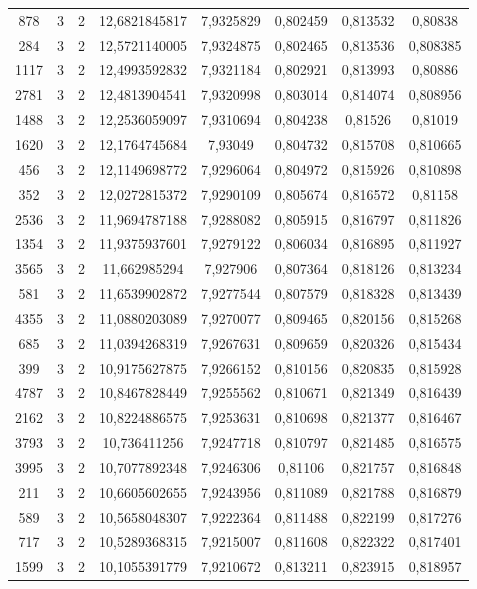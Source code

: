 \begin{longtable}{|c|c|c|c|c|c|c|c|}
878 & 3 & 2 & 12,6821845817 & 7,9325829 & 0,802459 & 0,813532 & 0,80838 \\
284 & 3 & 2 & 12,5721140005 & 7,9324875 & 0,802465 & 0,813536 & 0,808385 \\
1117 & 3 & 2 & 12,4993592832 & 7,9321184 & 0,802921 & 0,813993 & 0,80886 \\
2781 & 3 & 2 & 12,4813904541 & 7,9320998 & 0,803014 & 0,814074 & 0,808956 \\
1488 & 3 & 2 & 12,2536059097 & 7,9310694 & 0,804238 & 0,81526 & 0,81019 \\
1620 & 3 & 2 & 12,1764745684 & 7,93049 & 0,804732 & 0,815708 & 0,810665 \\
456 & 3 & 2 & 12,1149698772 & 7,9296064 & 0,804972 & 0,815926 & 0,810898 \\
352 & 3 & 2 & 12,0272815372 & 7,9290109 & 0,805674 & 0,816572 & 0,81158 \\
2536 & 3 & 2 & 11,9694787188 & 7,9288082 & 0,805915 & 0,816797 & 0,811826 \\
1354 & 3 & 2 & 11,9375937601 & 7,9279122 & 0,806034 & 0,816895 & 0,811927 \\
3565 & 3 & 2 & 11,662985294 & 7,927906 & 0,807364 & 0,818126 & 0,813234 \\
581 & 3 & 2 & 11,6539902872 & 7,9277544 & 0,807579 & 0,818328 & 0,813439 \\
4355 & 3 & 2 & 11,0880203089 & 7,9270077 & 0,809465 & 0,820156 & 0,815268 \\
685 & 3 & 2 & 11,0394268319 & 7,9267631 & 0,809659 & 0,820326 & 0,815434 \\
399 & 3 & 2 & 10,9175627875 & 7,9266152 & 0,810156 & 0,820835 & 0,815928 \\
4787 & 3 & 2 & 10,8467828449 & 7,9255562 & 0,810671 & 0,821349 & 0,816439 \\
2162 & 3 & 2 & 10,8224886575 & 7,9253631 & 0,810698 & 0,821377 & 0,816467 \\
3793 & 3 & 2 & 10,736411256 & 7,9247718 & 0,810797 & 0,821485 & 0,816575 \\
3995 & 3 & 2 & 10,7077892348 & 7,9246306 & 0,81106 & 0,821757 & 0,816848 \\
211 & 3 & 2 & 10,6605602655 & 7,9243956 & 0,811089 & 0,821788 & 0,816879 \\
589 & 3 & 2 & 10,5658048307 & 7,9222364 & 0,811488 & 0,822199 & 0,817276 \\
717 & 3 & 2 & 10,5289368315 & 7,9215007 & 0,811608 & 0,822322 & 0,817401 \\
1599 & 3 & 2 & 10,1055391779 & 7,9210672 & 0,813211 & 0,823915 & 0,818957 \\

\end{longtable}
